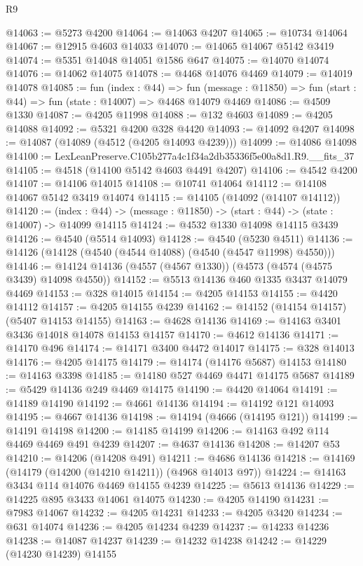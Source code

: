 \begin{lexlean}{R9}
\begin{coremodule}
@14063 := @5273 @4200
@14064 := @14063 @4207
@14065 := @10734 @14064
@14067 := @12915 @4603 @14033
@14070 := @14065 @14067 @5142 @3419
@14074 := @5351 @14048 @14051 @1586 @647
@14075 := @14070 @14074
@14076 := @14062 @14075
@14078 := @4468 @14076 @4469
@14079 := @14019 @14078
@14085 := fun (index : @44) =>
  fun (message : @11850) => fun (start : @44) => fun (state : @14007) => @4468 @14079 @4469
@14086 := @4509 @1330
@14087 := @4205 @11998
@14088 := @132 @4603
@14089 := @4205 @14088
@14092 := @5321 @4200 @328 @4420
@14093 := @14092 @4207
@14098 := @14087 (@14089 (@4512 (@4205 @14093 @4239)))
@14099 := @14086 @14098
@14100 := LexLeanPreserve.C105b277a4c1f34a2db35336f5e00a8d1.R9.__fits_37
@14105 := @4518 (@14100 @5142 @4603 @4491 @4207)
@14106 := @4542 @4200
@14107 := @14106 @14015
@14108 := @10741 @14064
@14112 := @14108 @14067 @5142 @3419 @14074
@14115 := @14105 (@14092 (@14107 @14112))
@14120 := (index : @44) -> (message : @11850) -> (start : @44) -> (state : @14007) -> @14099 @14115
@14124 := @4532 @1330 @14098 @14115 @3439
@14126 := @4540 (@5514 @14093)
@14128 := @4540 (@5230 @4511)
@14136 := @14126 (@14128 (@4540 (@4544 @14088) (@4540 (@4547 @11998) @4550)))
@14146 := @14124 @14136 (@4557 (@4567 @1330)) (@4573 (@4574 (@4575 @3439) @14098 @4550))
@14152 := @5513 @14136 @460 @1335 @3437 @14079 @4469
@14153 := @328 @14015
@14154 := @4205 @14153
@14155 := @4420 @14112
@14157 := @4205 @14155 @4239
@14162 := @14152 (@14154 @14157) (@5407 @14153 @14155)
@14163 := @4628 @14136
@14169 := @14163 @3401 @3436 @14018 @14078 @14153 @14157
@14170 := @4612 @14136
@14171 := @14170 @496
@14174 := @14171 @3400 @4472 @14017
@14175 := @328 @14013
@14176 := @4205 @14175
@14179 := @14174 (@14176 @5687) @14153
@14180 := @14163 @3398
@14185 := @14180 @527 @4469 @4471 @14175 @5687
@14189 := @5429 @14136 @249 @4469 @14175
@14190 := @4420 @14064
@14191 := @14189 @14190
@14192 := @4661 @14136
@14194 := @14192 @121 @14093
@14195 := @4667 @14136
@14198 := @14194 (@4666 (@14195 @121))
@14199 := @14191 @14198
@14200 := @14185 @14199
@14206 := @14163 @492 @114 @4469 @4469 @491 @4239
@14207 := @4637 @14136
@14208 := @14207 @53
@14210 := @14206 (@14208 @491)
@14211 := @4686 @14136
@14218 := @14169 (@14179 (@14200 (@14210 @14211)) (@4968 @14013 @97))
@14224 := @14163 @3434 @114 @14076 @4469 @14155 @4239
@14225 := @5613 @14136
@14229 := @14225 @895 @3433 @14061 @14075
@14230 := @4205 @14190
@14231 := @7983 @14067
@14232 := @4205 @14231
@14233 := @4205 @3420
@14234 := @631 @14074
@14236 := @4205 @14234 @4239
@14237 := @14233 @14236
@14238 := @14087 @14237
@14239 := @14232 @14238
@14242 := @14229 (@14230 @14239) @14155

\end{coremodule}
\end{lexlean}
